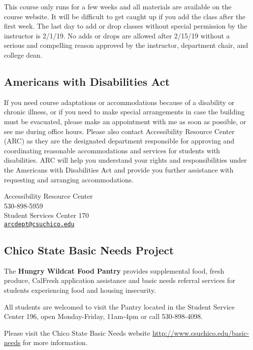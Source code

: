 \documentclass[11pt,]{article}
\begin{document}
This course only runs for a few weeks and all materials are available on
the course website. It will be difficult to get caught up if you add the
class after the first week. The last day to add or drop classes without
special permission by the instructor is 2/1/19. No adds or drops are
allowed after 2/15/19 without a serious and compelling reason approved
by the instructor, department chair, and college dean.

\hypertarget{americans-with-disabilities-act}{%
\subsection{Americans with Disabilities
Act}\label{americans-with-disabilities-act}}

If you need course adaptations or accommodations because of a disability
or chronic illness, or if you need to make special arrangements in case
the building must be evacuated, please make an appointment with me as
soon as possible, or see me during office hours. Please also contact
Accessibility Resource Center (ARC) as they are the designated
department responsible for approving and coordinating reasonable
accommodations and services for students with disabilities. ARC will
help you understand your rights and responsibilities under the Americans
with Disabilities Act and provide you further assistance with requesting
and arranging accommodations.

Accessibility Resource Center\\
530-898-5959\\
Student Services Center 170\\
\href{mailto:arcdept@csuchico.edu}{\nolinkurl{arcdept@csuchico.edu}}

\hypertarget{chico-state-basic-needs-project}{%
\subsection{Chico State Basic Needs
Project}\label{chico-state-basic-needs-project}}

The \textbf{Hungry Wildcat Food Pantry} provides supplemental food,
fresh produce, CalFresh application assistance and basic needs referral
services for students experiencing food and housing insecurity.

All students are welcomed to visit the Pantry located in the Student
Service Center 196, open Monday-Friday, 11am-4pm or call 530-898-4098.

Please visit the Chico State Basic Needs website
\url{http://www.csuchico.edu/basic-needs} for more information.
\end{document}
